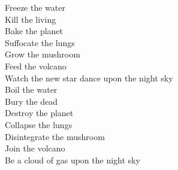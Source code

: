 Freeze the water\\
Kill the living\\
Bake the planet\\
Suffocate the lungs\\
Grow the mushroom\\
Feed the volcano\\
Watch the new star dance upon the night sky\\

Boil the water\\
Bury the dead\\
Destroy the planet\\
Collapse the lungs\\
Disintegrate the mushroom\\
Join the volcano\\
Be a cloud of gas upon the night sky\\
